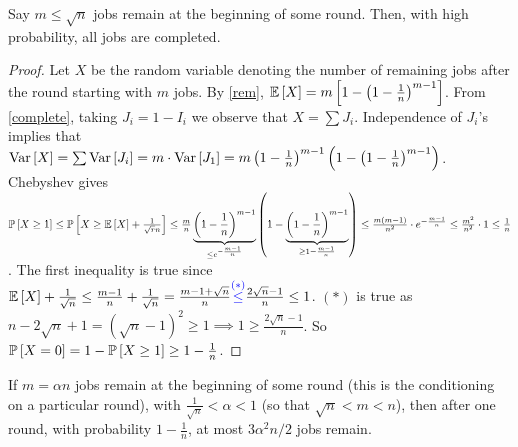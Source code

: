 \begin{cl}\label{last}
Say $m \le \sqrt n$ jobs remain at the beginning of some round. Then, with high probability, all jobs are completed.
\end{cl}
\begin{proof}
Let $X$ be the random variable denoting the number of remaining jobs after the round starting with $m$ jobs. By \cref{rem}, $\E X = m\left[1-\left(1-\frac{1}{n}\right)^{m-1}\right]$. From \cref{complete}, taking $J_{i} = 1-I_{i}$ we observe that $X=\sum J_{i}$. Independence of $J_{i}$'s implies that $\Var{X} = \sum \Var{J_{i}} = m \cdot \Var{J_{1}} = m\left(1-\frac{1}{n}\right)^{m-1}\left(1-\left(1-\frac{1}{n}\right)^{m-1}\right)$. Chebyshev gives $\P{X\ge 1}\le  \P{X\ge \E X + \frac{1}{\sqrt rn}}\le \frac{m}{n}\underbrace{\left(1-\frac{1}{n}\right)^{m-1}}_{\le e^{-\frac{m-1}{n}} }\left(1-\underbrace{\left(1-\frac{1}{n}\right)^{m-1}}_{\ge 1-\frac{m-1}{n}}\right) \le \frac{m(m-1)}{n^{2}}\cdot e^{-\frac{m-1}{n}}\le \frac{m^{2}}{n^{2}}\cdot 1\le \frac1n$.
The first inequality is true since $\E{X} + \frac{1}{\sqrt n} \le \frac{m-1}{n} + \frac{1}{\sqrt n} = \frac{m-1+\sqrt n}{n} { \color{blue}\stackrel{(*)}{\le}}\frac{2\sqrt n-1}{n} \le 1$. {\color{blue}$(*)$} is true as $n-2\sqrt n+1 = (\sqrt n-1)^{2} \ge 1 \implies 1 \ge \frac{2\sqrt n-1}{n}$. So $\P{X=0} = 1-\P{X\ge 1} \ge 1-\frac1n$.
\end{proof}



\begin{cl}
If $m=\alpha n$ jobs remain at the beginning of some round (this is the conditioning on a particular round), with $\frac{1}{\sqrt n}<\alpha <1$ (so that $\sqrt n<m<n$), then after one round, with probability $1-\frac1n$, at most $3\alpha^{2}n/2$ jobs remain.
\end{cl}

